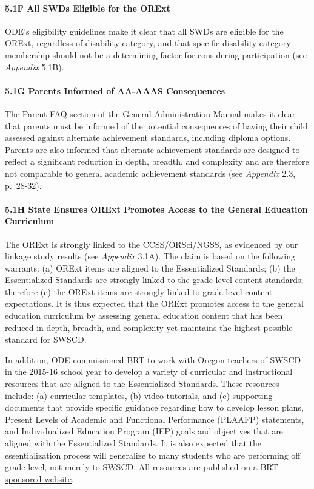 \documentclass[]{article}
\let\oldparagraph\paragraph
\renewcommand{\paragraph}[1]{\oldparagraph{#1}\mbox{}}
\begin{document}
\paragraph{5.1F All SWDs Eligible for the
ORExt}\label{f-all-swds-eligible-for-the-orext}

ODE's eligibility guidelines make it clear that all SWDs are eligible
for the ORExt, regardless of disability category, and that specific
disability category membership should not be a determining factor for
considering participation (see \emph{Appendix} 5.1B).

\paragraph{5.1G Parents Informed of AA-AAAS
Consequences}\label{g-parents-informed-of-aa-aaas-consequences}

The Parent FAQ section of the General Administration Manual makes it
clear that parents must be informed of the potential consequences of
having their child assessed against alternate achievement standards,
including diploma options. Parents are also informed that alternate
achievement standards are designed to reflect a significant reduction in
depth, breadth, and complexity and are therefore not comparable to
general academic achievement standards (see \emph{Appendix} 2.3,
p.~28-32).

\paragraph{5.1H State Ensures ORExt Promotes Access to the General
Education
Curriculum}\label{h-state-ensures-orext-promotes-access-to-the-general-education-curriculum}

The ORExt is strongly linked to the CCSS/ORSci/NGSS, as evidenced by our
linkage study results (see \emph{Appendix} 3.1A). The claim is based on
the following warrants: (a) ORExt items are aligned to the Essentialized
Standards; (b) the Essentialized Standards are strongly linked to the
grade level content standards; therefore (c) the ORExt items are
strongly linked to grade level content expectations. It is thus expected
that the ORExt promotes access to the general education curriculum by
assessing general education content that has been reduced in depth,
breadth, and complexity yet maintains the highest possible standard for
SWSCD.

In addition, ODE commissioned BRT to work with Oregon teachers of SWSCD
in the 2015-16 school year to develop a variety of curricular and
instructional resources that are aligned to the Essentialized Standards.
These resources include: (a) curricular templates, (b) video tutorials,
and (c) supporting documents that provide specific guidance regarding
how to develop lesson plans, Present Levels of Academic and Functional
Performance (PLAAFP) statements, and Individualized Education Program
(IEP) goals and objectives that are aligned with the Essentialized
Standards. It is also expected that the essentialization process will
generalize to many students who are performing off grade level, not
merely to SWSCD. All resources are published on a
\color{link}\href{http://lms.brtprojects.org}{BRT-sponsored
website}\color{black}.
\end{document}
